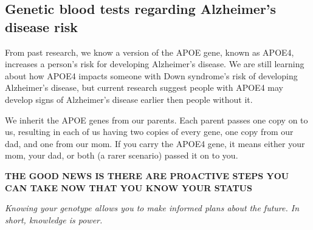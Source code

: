 \subsection{Genetic blood tests regarding Alzheimer’s disease risk}

From past research, we know a version of the APOE gene, known as APOE4, increases a person’s risk for developing Alzheimer’s disease. We are still learning about how APOE4 impacts someone with Down syndrome’s risk of developing Alzheimer’s disease, but current research suggest people with APOE4 may develop signs of Alzheimer’s disease earlier then people without it.

We inherit the APOE genes from our parents. Each parent passes one copy on to us, resulting in each of us having two copies of every gene, one copy from our dad, and one from our mom. If you carry the APOE4 gene, it means either your mom, your dad, or both (a rarer scenario) passed it on to you. 

\textbf{THE GOOD NEWS IS THERE ARE PROACTIVE STEPS YOU CAN TAKE NOW THAT YOU KNOW YOUR STATUS}

\textit{Knowing your genotype allows you to make informed plans about the future. In short, knowledge is power.}